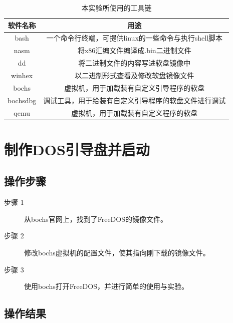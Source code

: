 \documentclass[forprint]{WHUBachelor}
\begin{document}
\begin{table}[htp]
  \caption{本实验所使用的工具链}
  \centering
  \begin{tabular}{cc}
    \toprule
    软件名称 & 用途  \\
    \midrule
    bash & 一个命令行终端，可提供linux的一些命令与执行shell脚本 \\
    nasm & 将x86汇编文件编译成.bin二进制文件 \\
    dd & 将二进制文件的内容写进软盘镜像中  \\
    winhex & 以二进制形式查看及修改软盘镜像文件 \\
    bochs & 虚拟机，用于加载装有自定义引导程序的软盘  \\
    bochsdbg & 调试工具，用于给装有自定义引导程序的软盘文件进行调试 \\
    qemu & 虚拟机，用于加载装有自定义程序的软盘 \\
    \bottomrule
  \end{tabular}
  \label{tab:tools}
\end{table}





\section{制作DOS引导盘并启动}

\subsection{操作步骤}

\begin{description}
  \item [步骤 1] 从bochs官网上，找到了FreeDOS的镜像文件。
  \item [步骤 2] 修改bochs虚拟机的配置文件，使其指向刚下载的镜像文件。
  \item [步骤 3] 使用bochs打开FreeDOS，并进行简单的使用与实验。
\end{description}

\subsection{操作结果}
\end{document}
